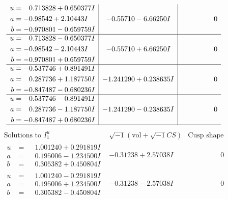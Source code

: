 \documentclass[1p]{elsarticle_modified}
\theoremstyle{definition}
\newcommand{\I}{\sqrt{-1}}
\begin{document}
$$\begin{array}{c|c|c}
\begin{aligned}
u &= \phantom{-}0.713828 + 0.650377 I \\
a &= -0.98542 + 2.10443 I \\
b &= -0.970801 - 0.659759 I\end{aligned}
 & -0.55710 - 6.66250 I & \phantom{-0.000000 } 0 \\ \hline\begin{aligned}
u &= \phantom{-}0.713828 - 0.650377 I \\
a &= -0.98542 - 2.10443 I \\
b &= -0.970801 + 0.659759 I\end{aligned}
 & -0.55710 + 6.66250 I & \phantom{-0.000000 } 0 \\ \hline\begin{aligned}
u &= -0.537746 + 0.891491 I \\
a &= \phantom{-}0.287736 + 1.187750 I \\
b &= -0.847487 - 0.680236 I\end{aligned}
 & -1.241290 + 0.238635 I & \phantom{-0.000000 } 0 \\ \hline\begin{aligned}
u &= -0.537746 - 0.891491 I \\
a &= \phantom{-}0.287736 - 1.187750 I \\
b &= -0.847487 + 0.680236 I\end{aligned}
 & -1.241290 - 0.238635 I & \phantom{-0.000000 } 0\\
 \hline 
 \end{array}$$\newpage$$\begin{array}{c|c|c}  
\text{Solutions to }I^u_{1}& \I (\text{vol} + \sqrt{-1}CS) & \text{Cusp shape}\\
 \hline 
\begin{aligned}
u &= \phantom{-}1.001240 + 0.291819 I \\
a &= \phantom{-}0.195006 - 1.234500 I \\
b &= \phantom{-}0.305382 + 0.450804 I\end{aligned}
 & -0.31238 + 2.57038 I & \phantom{-0.000000 } 0 \\ \hline\begin{aligned}
u &= \phantom{-}1.001240 - 0.291819 I \\
a &= \phantom{-}0.195006 + 1.234500 I \\
b &= \phantom{-}0.305382 - 0.450804 I\end{aligned}
 & -0.31238 - 2.57038 I & \phantom{-0.000000 } 0 \\ \hline\begin{aligned}

\end{aligned}
\end{array}$$
\end{document}
